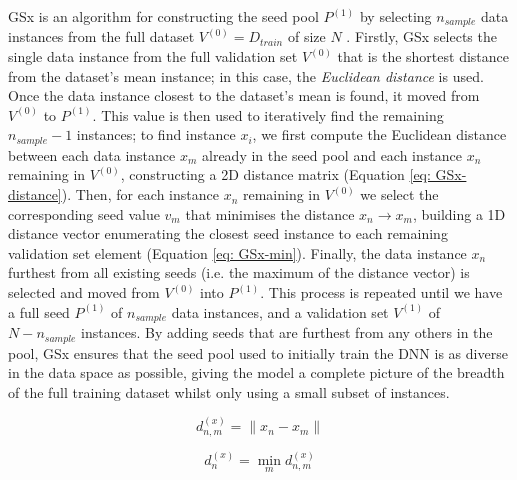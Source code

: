 \documentclass[a4paper, 11pt]{report}
\begin{document}
    GSx \citep{wu-2019} is an algorithm for constructing the seed pool $P^{(1)}$ by selecting $n_{sample}$ data instances from the full dataset $V^{(0)} = D_{train}$ of size $N$ \citep{wu-2019}. Firstly, GSx selects the single data instance from the full validation set $V^{(0)}$ that is the shortest distance from the dataset's mean instance; in this case, the \emph{Euclidean distance} is used. Once the data instance closest to the dataset's mean is found, it moved from $V^{(0)}$ to $P^{(1)}$. This value is then used to iteratively find the remaining $n_{sample} - 1$ instances; to find instance $x_i$, we first compute the Euclidean distance between each data instance $x_m$ already in the seed pool and each instance $x_n$ remaining in $V^{(0)}$, constructing a 2D distance matrix (Equation \ref{eq: GSx-distance}). Then, for each instance $x_n$ remaining in $V^{(0)}$ we select the corresponding seed value $v_m$ that minimises the distance $x_n \to x_m$, building a 1D distance vector enumerating the closest seed instance to each remaining validation set element (Equation \ref{eq: GSx-min}). Finally, the data instance $x_n$ furthest from all existing seeds (i.e. the maximum of the distance vector) is selected and moved from $V^{(0)}$ into $P^{(1)}$. This process is repeated until we have a full seed $P^{(1)}$ of $n_{sample}$ data instances, and a validation set $V^{(1)}$ of $N - n_{sample}$ instances. By adding seeds that are furthest from any others in the pool, GSx ensures that the seed pool used to initially train the DNN is as diverse in the data space as possible, giving the model a complete picture of the breadth of the full training dataset whilst only using a small subset of instances.


    \begin{equation}
        \label{eq: GSx-distance}
        d^{(x)}_{n, m} = \lVert x_n - x_m \lVert
    \end{equation}
  
    \begin{equation}
        \label{eq: GSx-min}
        d^{(x)}_n = \min_m d^{(x)}_{n, m}
    \end{equation}
\end{document}
